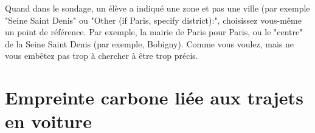 \documentclass{exam}
\begin{document}
\begin{questions}
\begin{Indication}
    Quand dans le sondage, un élève a indiqué une zone et pas une ville (par exemple "Seine Saint Denis" ou "Other (if Paris, specify district):", choisissez vous-même un point de référence. Par exemple, la mairie de Paris pour Paris, ou le "centre" de la Seine Saint Denis (par exemple, Bobigny). Comme vous voulez, mais ne vous embêtez pas trop à chercher à être trop précis.
  \end{Indication}
\end{questions}

\section{Empreinte carbone liée aux trajets en voiture}

\begin{questions}
  

\end{questions}
\end{document}

